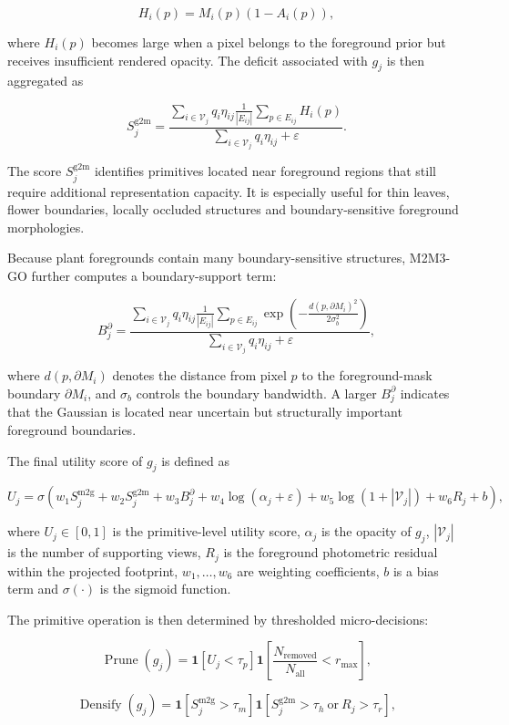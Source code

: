 \documentclass[a4paper]{cas-sc}
\begin{document}
\[
H_i(p)=M_i(p)\left(1-A_i(p)\right),
\]

where \(H_i(p)\) becomes large when a pixel belongs to the foreground prior but receives insufficient rendered opacity. The deficit associated with \(g_j\) is then aggregated as

\[
S^{\text{g2m}}_j=
\frac{
\sum_{i\in \mathcal{V}_j} q_i \eta_{ij}
\frac{1}{|E_{ij}|}\sum_{p\in E_{ij}} H_i(p)
}{
\sum_{i\in \mathcal{V}_j} q_i \eta_{ij}+\varepsilon
}.
\]

The score \(S^{\text{g2m}}_j\) identifies primitives located near foreground regions that still require additional representation capacity. It is especially useful for thin leaves, flower boundaries, locally occluded structures and boundary-sensitive foreground morphologies.

Because plant foregrounds contain many boundary-sensitive structures, M2M3-GO further computes a boundary-support term:

\[
B^{\partial}_j=
\frac{
\sum_{i\in \mathcal{V}_j} q_i \eta_{ij}
\frac{1}{|E_{ij}|}\sum_{p\in E_{ij}}
\exp\left(-\frac{d(p,\partial M_i)^2}{2\sigma_b^2}\right)
}{
\sum_{i\in \mathcal{V}_j} q_i \eta_{ij}+\varepsilon
},
\]

where \(d(p,\partial M_i)\) denotes the distance from pixel \(p\) to the foreground-mask boundary \(\partial M_i\), and \(\sigma_b\) controls the boundary bandwidth. A larger \(B^{\partial}_j\) indicates that the Gaussian is located near uncertain but structurally important foreground boundaries.

The final utility score of \(g_j\) is defined as

\[
U_j=
\sigma\left(
w_1 S^{\text{m2g}}_j
+w_2 S^{\text{g2m}}_j
+w_3 B^{\partial}_j
+w_4 \log(\alpha_j+\varepsilon)
+w_5 \log(1+|\mathcal{V}_j|)
+w_6 R_j
+b
\right),
\]

where \(U_j\in[0,1]\) is the primitive-level utility score, \(\alpha_j\) is the opacity of \(g_j\), \(|\mathcal{V}_j|\) is the number of supporting views, \(R_j\) is the foreground photometric residual within the projected footprint, \(w_1,\ldots,w_6\) are weighting coefficients, \(b\) is a bias term and \(\sigma(\cdot)\) is the sigmoid function.

The primitive operation is then determined by thresholded micro-decisions:

\[
\operatorname{Prune}(g_j)=
\mathbf{1}\left[U_j<\tau_p\right]
\mathbf{1}\left[\frac{N_{\text{removed}}}{N_{\text{all}}}<r_{\max}\right],
\]

\[
\operatorname{Densify}(g_j)=
\mathbf{1}\left[S^{\text{m2g}}_j>\tau_m\right]
\mathbf{1}\left[S^{\text{g2m}}_j>\tau_h \ \text{or}\ R_j>\tau_r\right],
\]
\end{document}
